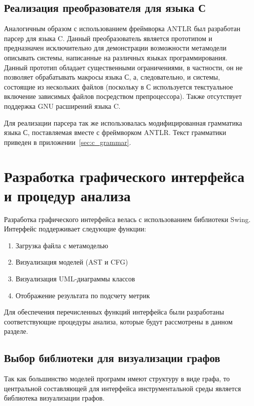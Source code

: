 \subsection{Реализация преобразователя для языка С}

Аналогичным образом с использованием фреймворка ANTLR был разработан парсер для
языка C. Данный преобразователь является прототипом и предназначен исключительно
для демонстрации возможности метамодели описывать системы, написанные на
различных языках программирования. Данный прототип обладает существенными
ограничениями, в частности, он не позволяет обрабатывать макросы языка С, а,
следовательно, и системы, состоящие из нескольких файлов (поскольку в С
используется текстуальное включение зависимых файлов посредством препроцессора).
Также отсутствует поддержка GNU расширений языка C.

Для реализации парсера так же использовалась модифицированная грамматика языка
С,  поставляемая вместе с фреймворком ANTLR. Текст грамматики приведен в
приложении~\ref{sec:c_grammar}.

\section{Разработка графического интерфейса и процедур анализа}

Разработка графического интерфейса велась с использованием библиотеки Swing.
Интерфейс поддерживает следующие функции:

\begin{enumerate}
    \item Загрузка файла с метамоделью
    \item Визуализация моделей (AST и CFG)
    \item Визуализация UML-диаграммы классов
    \item Отображение результата по подсчету метрик
\end{enumerate}

Для обеспечения перечисленных функций интерфейса были разработаны
соответствующие процедуры анализа, которые будут рассмотрены в данном разделе.

\subsection{Выбор библиотеки для визуализации графов}

Так как большинство моделей программ имеют структуру в виде графа, то
центральной составляющей для интерфейса инструментальной среды является
библиотека визуализации графов.

